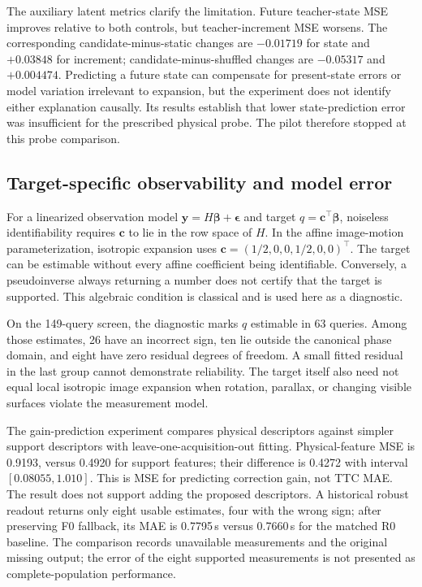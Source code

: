 The auxiliary latent metrics clarify the limitation. Future teacher-state MSE improves relative to both controls, but teacher-increment MSE worsens. The corresponding candidate-minus-static changes are $-0.01719$ for state and $+0.03848$ for increment; candidate-minus-shuffled changes are $-0.05317$ and $+0.004474$. Predicting a future state can compensate for present-state errors or model variation irrelevant to expansion, but the experiment does not identify either explanation causally. Its results establish that lower state-prediction error was insufficient for the prescribed physical probe. The pilot therefore stopped at this probe comparison. 

\subsection{Target-specific observability and model error}
For a linearized observation model $\mathbf y=H\boldsymbol\beta+\boldsymbol\epsilon$ and target $q=\mathbf c^\top\boldsymbol\beta$, noiseless identifiability requires $\mathbf c$ to lie in the row space of $H$. In the affine image-motion parameterization, isotropic expansion uses $\mathbf c=(1/2,0,0,1/2,0,0)^\top$. The target can be estimable without every affine coefficient being identifiable. Conversely, a pseudoinverse always returning a number does not certify that the target is supported. This algebraic condition is classical and is used here as a diagnostic. 

On the 149-query screen, the diagnostic marks $q$ estimable in 63 queries. Among those estimates, 26 have an incorrect sign, ten lie outside the canonical phase domain, and eight have zero residual degrees of freedom. A small fitted residual in the last group cannot demonstrate reliability. The target itself also need not equal local isotropic image expansion when rotation, parallax, or changing visible surfaces violate the measurement model.

The gain-prediction experiment compares physical descriptors against simpler support descriptors with leave-one-acquisition-out fitting. Physical-feature MSE is 0.9193, versus 0.4920 for support features; their difference is 0.4272 with interval $[0.08055,1.010]$. This is MSE for predicting correction gain, not TTC MAE. The result does not support adding the proposed descriptors. A historical robust readout returns only eight usable estimates, four with the wrong sign; after preserving F0 fallback, its MAE is 0.7795\,s versus 0.7660\,s for the matched R0 baseline. The comparison records unavailable measurements and the original missing output; the error of the eight supported measurements is not presented as complete-population performance. 

